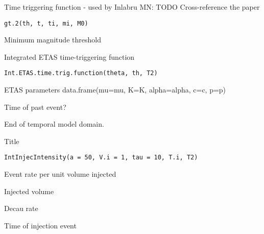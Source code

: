\documentclass[letterpaper]{book}
\begin{document}
%
\begin{Description}\relax
Time triggering function - used by Inlabru
MN: TODO Cross-reference the paper
\end{Description}
%
\begin{Usage}
\begin{verbatim}
gt.2(th, t, ti, mi, M0)
\end{verbatim}
\end{Usage}
%
\begin{Arguments}
\begin{ldescription}
\item[\code{M0}] Minimum magnitude threshold
\end{ldescription}
\end{Arguments}
%
\begin{Description}\relax
Integrated ETAS time-triggering function
\end{Description}
%
\begin{Usage}
\begin{verbatim}
Int.ETAS.time.trig.function(theta, th, T2)
\end{verbatim}
\end{Usage}
%
\begin{Arguments}
\begin{ldescription}
\item[\code{theta}] ETAS parameters data.frame(mu=mu, K=K, alpha=alpha, c=c, p=p)

\item[\code{th}] Time of past event? 

\item[\code{T2}] End of temporal model domain.
\end{ldescription}
\end{Arguments}
%
\begin{Description}\relax
Title
\end{Description}
%
\begin{Usage}
\begin{verbatim}
IntInjecIntensity(a = 50, V.i = 1, tau = 10, T.i, T2)
\end{verbatim}
\end{Usage}
%
\begin{Arguments}
\begin{ldescription}
\item[\code{a}] Event rate per unit volume injected

\item[\code{V.i}] Injected volume

\item[\code{tau}] Decau rate 

\item[\code{T.i}] Time of injection event

\item[\code{T2}] 
\end{ldescription}
\end{Arguments}
\end{document}

